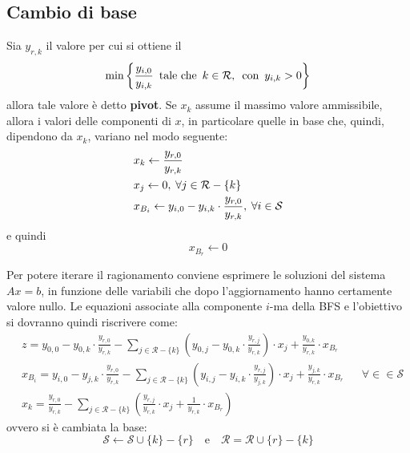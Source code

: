 \documentclass[a4paper]{extarticle}
\begin{document}
\subsection{Cambio di base}
Sia $y_{r,k}$ il valore per cui si ottiene il 
\[\min \left\{\frac{y_{i,0}}{y_{i,k}} \hspace{0.5em} \text{tale che} \hspace{0.5em} k \in \mathcal{R}, \hspace{0.5em} \text{con} \hspace{0.5em} y_{i,k} > 0\right\}\]
allora tale valore è detto \textbf{pivot}. Se $x_k$ assume il massimo valore ammissibile, allora i valori delle componenti di $x$, in particolare quelle in base che, quindi, dipendono da $x_k$, variano nel modo seguente:
\begin{align*}
    &x_k \leftarrow \dfrac{y_{r,0}}{y_{r,k}}\\
    &x_j \leftarrow 0, \hspace{0.25em} \forall j \in \mathcal{R}-\{k\}\\
    &x_{B_i} \leftarrow y_{i,0}-y_{i,k} \cdot \dfrac{y_{r,0}}{y_{r,k}}, \hspace{0.25em} \forall i \in \mathcal{S}
\end{align*}
e quindi
\[x_{B_r} \leftarrow 0\]

\vspace{1em}
\noindent
Per potere iterare il ragionamento conviene esprimere le soluzioni del sistema $Ax = b$, in funzione delle variabili che dopo l'aggiornamento hanno certamente valore nullo. Le equazioni associate alla componente $i$-ma della BFS e l'obiettivo si dovranno quindi riscrivere come:
\begin{align*}
    &z=y_{0,0}-y_{0,k} \cdot \frac{y_{r,0}}{y_{r,k}} - \sum_{j \in \mathcal{R} - \{k\}} \left(y_{0,j}-y_{0,k} \cdot \frac{y_{r,j}}{y_{r,k}}\right) \cdot x_j + \frac{y_{0,k}}{y_{r,k}} \cdot x_{B_r}&&\\
    &x_{B_i} = y_{i,0} - y_{j,k} \cdot \frac{y_{r,0}}{y_{r,k}} - \sum_{j \in \mathcal{R}-\{k\}} \left(y_{i,j} - y_{i,k} \cdot \frac{y_{r,j}}{y_{j,k}}\right) \cdot x_j + \frac{y_{j,k}}{y_{r,k}} \cdot x_{B_r}&&\forall \in \in \mathcal{S}\\
    &x_k = \frac{y_{r,0}}{y_{r,k}} - \sum_{j \in \mathcal{R} - \{k\}} \left(\frac{y_{r,j}}{y_{r,k}} \cdot x_j + \frac{1}{y_{r,k}} \cdot x_{B_r}\right)&&
\end{align*}
ovvero si è cambiata la base:
\[\mathcal{S} \leftarrow \mathcal{S} \cup \{k\} - \{r\} \hspace{1em} \text{e} \hspace{1em} \mathcal{R} = \mathcal{R} \cup \{r\} - \{k\}\]
\end{document}
